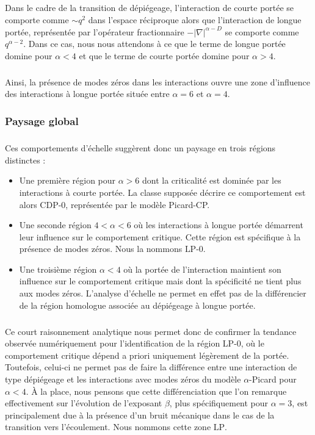 \subparagraph{}Dans le cadre de la transition de dépiégeage, l'interaction de courte portée se comporte comme $\sim q^2$ dans l'espace réciproque alors que l'interaction de longue portée, représentée par l'opérateur fractionnaire $-|\nabla|^{\alpha-D}$ se comporte comme $q^{\alpha-2}$. Dans ce cas, nous nous attendons à ce que le terme de longue portée domine pour $\alpha < 4$ et que le terme de courte portée domine pour $\alpha > 4$.

\subparagraph{}Ainsi, la présence de modes zéros dans les interactions ouvre une zone d'influence des interactions à longue portée située entre $\alpha = 6$ et $\alpha = 4$.

\subsubsection{Paysage global}

\subparagraph{}Ces comportements d'échelle suggèrent donc un paysage en trois régions distinctes :

\begin{itemize}
	\item Une première région pour $\alpha>6$ dont la criticalité est dominée par les interactions à courte portée. La classe supposée décrire ce comportement est alors CDP-0, représentée par le modèle Picard-CP.
	\item Une seconde région $4<\alpha<6$ où les interactions à longue portée démarrent leur influence sur le comportement critique. Cette région est spécifique à la présence de modes zéros. Nous la nommons $\text{LP-0}$.
	\item Une troisième région $\alpha <4$ où la portée de l'interaction maintient son influence sur le comportement critique mais dont la spécificité ne tient plus aux modes zéros. L'analyse d'échelle ne permet en effet pas de la différencier de la région homologue associée au dépiégeage à longue portée.
\end{itemize}

\subparagraph{}Ce court raisonnement analytique nous permet donc de confirmer la tendance observée numériquement pour l'identification de la région LP-0, où le comportement critique dépend a priori uniquement légèrement de la portée. Toutefois, celui-ci ne permet pas de faire la différence entre une interaction de type dépiégeage et les interactions avec modes zéros du modèle $\alpha$-Picard pour $\alpha<4$. \`A la place, nous pensons que cette différenciation que l'on remarque effectivement sur l'évolution de l'exposant $\beta$, plus spécifiquement pour $\alpha = 3$, est principalement due à la présence d'un bruit mécanique dans le cas de la transition vers l'écoulement. Nous nommons cette zone $\text{LP}$.

